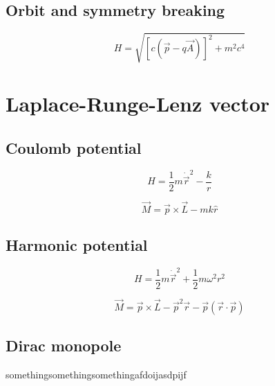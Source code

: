\documentclass[titlepage]{article}
\begin{document}
\subsection{Orbit and symmetry breaking}

$$H=\sqrt{[c(\vec{p}-q\vec{A})]^2+m^2c^4}$$

\section{Laplace-Runge-Lenz vector}
\subsection{Coulomb potential}

$$H=\frac{1}{2}m\dot{\vec{r}}^2-\frac{k}{r}$$

$$\vec{M}=\vec{p} \times \vec{L}-mk \hat{r}$$

\subsection{Harmonic potential}

$$H=\frac{1}{2}m\dot{\vec{r}}^2+\frac{1}{2}m\omega^2r^2$$

$$\vec{M} = \vec{p} \times \vec{L} - \vec{p}^2 \vec{r} - \vec{p}(\vec{r}\cdot \vec{p})$$

\subsection{Dirac monopole}

somethingsomethingsomethingafdoijasdpijf
\end{document}
